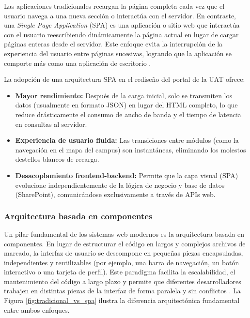 Las aplicaciones tradicionales recargan la página completa cada vez que el usuario navega a una nueva sección o interactúa con el servidor. En contraste, una \textit{Single Page Application} (SPA) es una aplicación o sitio web que interactúa con el usuario reescribiendo dinámicamente la página actual en lugar de cargar páginas enteras desde el servidor. Este enfoque evita la interrupción de la experiencia del usuario entre páginas sucesivas, logrando que la aplicación se comporte más como una aplicación de escritorio \cite{mikowski2013single}.

La adopción de una arquitectura SPA en el rediseño del portal de la UAT ofrece:
\begin{itemize}
    \item \textbf{Mayor rendimiento:} Después de la carga inicial, solo se transmiten los datos (usualmente en formato JSON) en lugar del HTML completo, lo que reduce drásticamente el consumo de ancho de banda y el tiempo de latencia en consultas al servidor.
    \item \textbf{Experiencia de usuario fluida:} Las transiciones entre módulos (como la navegación en el mapa del campus) son instantáneas, eliminando los molestos destellos blancos de recarga.
    \item \textbf{Desacoplamiento frontend-backend:} Permite que la capa visual (SPA) evolucione independientemente de la lógica de negocio y base de datos (SharePoint), comunicándose exclusivamente a través de APIs web.
\end{itemize}

\subsubsection*{Arquitectura basada en componentes}

Un pilar fundamental de los sistemas web modernos es la arquitectura basada en componentes. En lugar de estructurar el código en largos y complejos archivos de marcado, la interfaz de usuario se descompone en pequeñas piezas encapsuladas, independientes y reutilizables (por ejemplo, una barra de navegación, un botón interactivo o una tarjeta de perfil). Este paradigma facilita la escalabilidad, el mantenimiento del código a largo plazo y permite que diferentes desarrolladores trabajen en distintas piezas de la interfaz de forma paralela y sin conflictos \cite{flanagan2020javascript}. La Figura \ref{fig:tradicional_vs_spa} ilustra la diferencia arquitectónica fundamental entre ambos enfoques.

